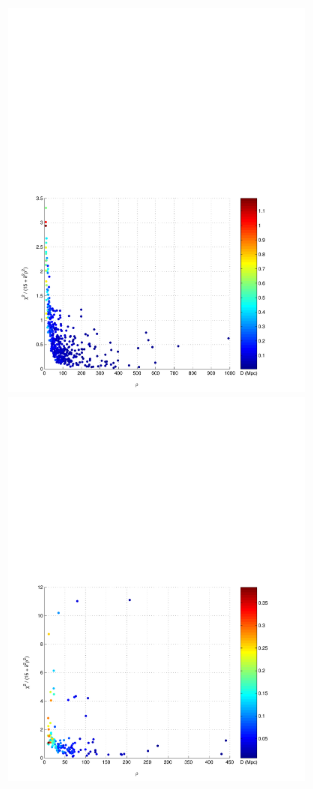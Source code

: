 \begin{figure}[p]
\begin{center}
\includegraphics[width=0.7\textwidth]{figures/result/l1_inj_snr_7_0_delta_0_04_chisq_5_0}\\
\includegraphics[width=0.7\textwidth]{figures/result/h1_inj_snr_7_0_delta_0_04_chisq_12_5}
\end{center}

\end{figure}
